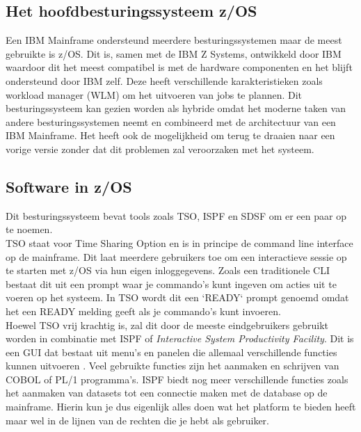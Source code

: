 \subsection{Het hoofdbesturingssysteem z/OS}
Een IBM Mainframe ondersteund meerdere besturingssystemen maar de meest gebruikte is z/OS. Dit is, samen met de IBM Z Systems, ontwikkeld door IBM waardoor dit het meest compatibel is met de hardware componenten en het blijft ondersteund door IBM zelf. Deze heeft verschillende karakteristieken zoals workload manager (WLM) om het uitvoeren van jobs te plannen. Dit besturingssysteem kan gezien worden als hybride omdat het moderne taken van andere besturingssystemen neemt en combineerd met de architectuur van een IBM Mainframe. Het heeft ook de mogelijkheid om terug te draaien naar een vorige versie zonder dat dit problemen zal veroorzaken met het systeem. \autocite{Rupp2022}

\subsection{Software in z/OS}
Dit besturingssysteem bevat tools zoals TSO, ISPF en SDSF om er een paar op te noemen. \\

TSO staat voor Time Sharing Option en is in principe de command line interface op de mainframe. Dit laat meerdere gebruikers toe om een interactieve sessie op te starten met z/OS via hun eigen inloggegevens. Zoals een traditionele CLI bestaat dit uit een prompt waar je commando's kunt ingeven om acties uit te voeren op het systeem. In TSO wordt dit een `READY` prompt genoemd omdat het een READY melding geeft als je commando's kunt invoeren. \autocite{IBM} \\

Hoewel TSO vrij krachtig is, zal dit door de meeste eindgebruikers gebruikt worden in combinatie met ISPF of \textit{Interactive System Productivity Facility}. Dit is een GUI dat bestaat uit menu's en panelen die allemaal verschillende functies kunnen uitvoeren \autocite{IBM}. Veel gebruikte functies zijn het aanmaken en schrijven van COBOL of PL/1 programma's. ISPF biedt nog meer verschillende functies zoals het aanmaken van datasets tot een connectie maken met de database op de mainframe. Hierin kun je dus eigenlijk alles doen wat het platform te bieden heeft maar wel in de lijnen van de rechten die je hebt als gebruiker. \\

